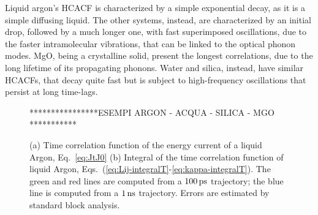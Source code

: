 \begin{LEtext}
Liquid argon's HCACF is characterized by a simple exponential decay, as it is a simple diffusing liquid. The other systems, instead, are characterized by an initial drop, followed by a much longer one, with fast superimposed oscillations, due to the faster intramolecular vibrations, that can be linked to the optical phonon modes. MgO, being a crystalline solid, present the longest correlations, due to the long lifetime of its propagating phonons. Water and silica, instead, have similar HCACFs, that decay quite fast but is subject to high-frequency oscillations that persist at long time-lags.

\begin{figure}
    \begin{center}
    ****************ESEMPI ARGON - ACQUA - SILICA - MGO ***********
    \end{center}
	\caption{(a) Time correlation function of the energy current of a liquid Argon, Eq.~\eqref{eq:JtJ0}
    (b) Integral of the time correlation function of liquid Argon, Eqs.~(\ref{eq:Lij-integralT}-\ref{eq:kappa-integralT}).
    The green and red lines are computed from a $100\,\mathrm{ps}$ trajectory; the blue line is computed from a $1\,\mathrm{ns}$ trajectory.
    Errors are estimated by standard block analysis.} \label{fig:kappa-examples}
\end{figure}



\end{LEtext}
